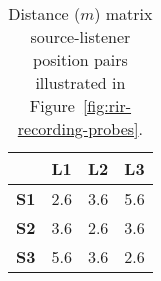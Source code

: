 \begin{table}[htbp]
    \centering
    \caption[Ray tracing testing --- source-listener position distance matrix]{Distance ($m$) matrix source-listener position pairs illustrated in Figure~\ref{fig:rir-recording-probes}.}\label{tab:source-listener-distances}
    \begin{tabular}{@{}llll@{}}
    \toprule
       & \textbf{L1}  & \textbf{L2}  & \textbf{L3}  \\ \midrule
    \textbf{S1} & 2.6 & 3.6 & 5.6 \\
    \textbf{S2} & 3.6 & 2.6 & 3.6 \\
    \textbf{S3} & 5.6 & 3.6 & 2.6 \\ \bottomrule
    \end{tabular}
\end{table}